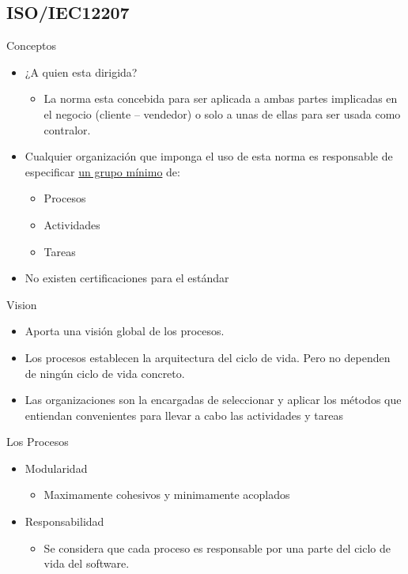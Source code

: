 \documentclass{beamer}
\begin{document}
			
			\subsection{ISO/IEC12207}
			\begin{frame}{Conceptos}
				\begin{itemize}
					\item ¿A quien esta dirigida?
					\begin{itemize}
						\item La norma esta concebida para ser aplicada a ambas partes implicadas en el negocio (cliente – vendedor) o solo a unas de ellas para ser usada como contralor.
					\end{itemize}
					
					\item Cualquier organización que imponga el uso de esta norma es responsable de especificar \underline{un grupo mínimo} de:
				
					\begin{itemize}
						\item Procesos
						\item Actividades
						\item Tareas
					\end{itemize}
				
					\item No existen certificaciones para el estándar
				\end{itemize}
			\end{frame}

			\begin{frame}{Vision}
				\begin{itemize}
					\item Aporta una visión global de los procesos.
					\item Los procesos establecen la arquitectura del ciclo de vida. Pero no dependen de ningún ciclo de vida concreto.
					\item Las organizaciones son la encargadas de seleccionar y aplicar los métodos que entiendan convenientes para llevar a cabo las actividades y tareas
				\end{itemize}
			\end{frame}
			
			\begin{frame}{Los Procesos}
				\begin{itemize}
				 	\item Modularidad
					 \begin{itemize}
				 		\item Maximamente cohesivos y minimamente acoplados 
				 	 \end{itemize}				  
					 \item Responsabilidad
				 	\begin{itemize}
						 \item Se considera que cada proceso es responsable por una parte del ciclo de vida del software.
				 	\end{itemize}
				 \end{itemize}
			\end{frame}
			
\end{document}
